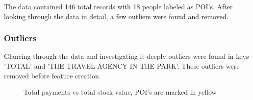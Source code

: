 \documentclass[12pt]{article}%
\begin{document}
The data contained 146 total records with 18 people labeled as POI's. After looking through the data in detail, a few outliers were found and removed. 	

\subsubsection*{Outliers}

Glancing through the data and investigating it deeply outliers were found in keys 'TOTAL' and 'THE TRAVEL AGENCY IN THE PARK'. These outliers were removed before feature creation.

\begin{figure}[!htbp]
  \centering
  \hfill
  \caption{Total payments vs total stock value, POI's are marked in yellow}
\end{figure}
\end{document}

